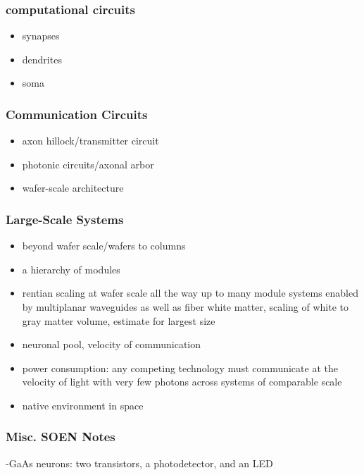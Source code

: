 \subsubsection{computational circuits}
\begin{itemize}
\item synapses
\item dendrites
\item soma
\end{itemize}

\subsubsection{Communication Circuits}
\begin{itemize}
\item axon hillock/transmitter circuit
\item photonic circuits/axonal arbor
\item wafer-scale architecture
\end{itemize}

\subsubsection{Large-Scale Systems}
\begin{itemize}
\item beyond wafer scale/wafers to columns
\item a hierarchy of modules
\item rentian scaling at wafer scale all the way up to many module systems enabled by multiplanar waveguides as well as fiber white matter, scaling of white to gray matter volume, estimate for largest size
\item neuronal pool, velocity of communication
\item power consumption: any competing technology must communicate at the velocity of light with very few photons across systems of comparable scale
\item native environment in space
\end{itemize}

\subsubsection{Misc. SOEN Notes}

\vspace{3em}
-\cite{psbr1990}GaAs neurons: two transistors, a photodetector, and an LED

\vspace{3em}

